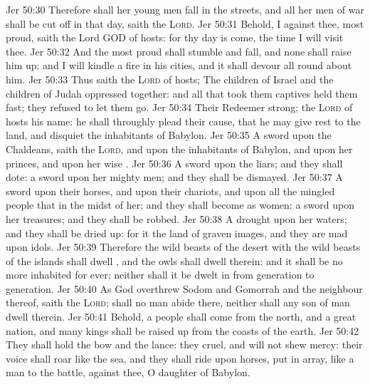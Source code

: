 \vs Jer 50:30 Therefore shall her young men fall in the streets, and all her men of war shall be cut off in that day, saith the \textsc{Lord}.
\vs Jer 50:31 Behold, I  against thee,  most proud, saith the Lord GOD of hosts: for thy day is come, the time  I will visit thee.
\vs Jer 50:32 And the most proud shall stumble and fall, and none shall raise him up: and I will kindle a fire in his cities, and it shall devour all round about him.
\vs Jer 50:33 Thus saith the \textsc{Lord} of hosts; The children of Israel and the children of Judah  oppressed together: and all that took them captives held them fast; they refused to let them go.
\vs Jer 50:34 Their Redeemer  strong; the \textsc{Lord} of hosts  his name: he shall throughly plead their cause, that he may give rest to the land, and disquiet the inhabitants of Babylon.
\vs Jer 50:35 A sword  upon the Chaldeans, saith the \textsc{Lord}, and upon the inhabitants of Babylon, and upon her princes, and upon her wise .
\vs Jer 50:36 A sword  upon the liars; and they shall dote: a sword  upon her mighty men; and they shall be dismayed.
\vs Jer 50:37 A sword  upon their horses, and upon their chariots, and upon all the mingled people that  in the midst of her; and they shall become as women: a sword  upon her treasures; and they shall be robbed.
\vs Jer 50:38 A drought  upon her waters; and they shall be dried up: for it  the land of graven images, and they are mad upon  idols.
\vs Jer 50:39 Therefore the wild beasts of the desert with the wild beasts of the islands shall dwell , and the owls shall dwell therein: and it shall be no more inhabited for ever; neither shall it be dwelt in from generation to generation.
\vs Jer 50:40 As God overthrew Sodom and Gomorrah and the neighbour  thereof, saith the \textsc{Lord};  shall no man abide there, neither shall any son of man dwell therein.
\vs Jer 50:41 Behold, a people shall come from the north, and a great nation, and many kings shall be raised up from the coasts of the earth.
\vs Jer 50:42 They shall hold the bow and the lance: they  cruel, and will not shew mercy: their voice shall roar like the sea, and they shall ride upon horses,  put in array, like a man to the battle, against thee, O daughter of Babylon.

